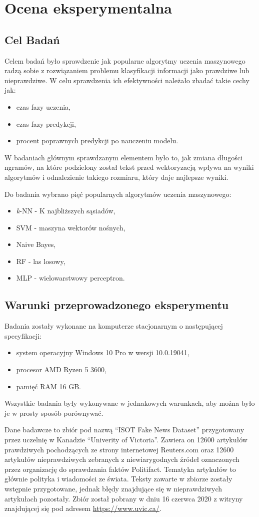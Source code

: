 \chapter{Ocena eksperymentalna}
\section{Cel Badań}
Celem badań było sprawdzenie jak popularne algorytmy uczenia maszynowego radzą sobie z rozwiązaniem problemu 
klasyfikacji informacji jako prawdziwe lub nieprawdziwe. W celu sprawdzenia ich efektywności należało zbadać
takie cechy jak:
\begin{itemize}
    \item czas fazy uczenia,
    \item czas fazy predykcji,
    \item procent poprawnych predykcji po nauczeniu modelu.
\end{itemize}
W badaniach głównym sprawdzanym elementem było to, jak zmiana długości ngramów, na które podzielony
został tekst przed wektoryzacją wpływa na wyniki algorytmów i odnalezienie takiego rozmiaru, który
daje najlepsze wyniki. 

Do badania wybrano pięć popularnych algorytmów uczenia maszynowego: 
\begin{itemize}
    \item \textit{k}-NN - K najbliższych sąsiadów,
    \item SVM - maszyna wektorów nośnych,
    \item Naive Bayes,
    \item RF - las losowy,
    \item MLP - wielowarstwowy perceptron.
\end{itemize} 
\section{Warunki przeprowadzonego eksperymentu}
Badania zostały wykonane na komputerze stacjonarnym o następującej specyfikacji:
\begin{itemize}
    \item system operacyjny Windows 10 Pro w wersji 10.0.19041,
    \item procesor AMD Ryzen 5 3600,
    \item pamięć RAM 16 GB.
\end{itemize}
Wszystkie badania były wykonywane w jednakowych warunkach, aby można było 
je w prosty sposób porównywać. 

Dane badawcze to zbiór pod nazwą ``ISOT Fake News Dataset'' przygotowany przez uczelnię w 
Kanadzie ``Univerity of Victoria''. Zawiera on 12600 artykułów prawdziwych pochodzących ze strony
internetowej Reuters.com oraz 12600 artykułów nieprawdziwych zebranych z niewiarygodnych źródeł
oznaczonych przez organizację do sprawdzania faktów Politifact. Tematyka artykułów to głównie polityka i wiadomości 
ze świata.  Teksty zawarte w zbiorze zostały wstępnie przygotowane, jednak błędy znajdujące się w nieprawdziwych 
artykułach pozostały. Zbiór został pobrany w dniu 16 czerwca 2020 z witryny znajdującej się pod adresem \url{https://www.uvic.ca/}.~\cite{ISOT}

